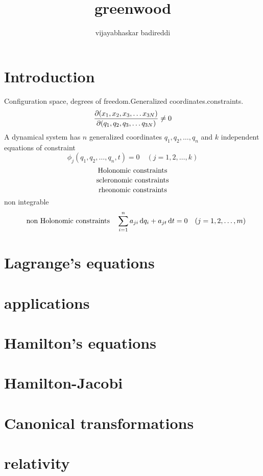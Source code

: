 \documentclass[12pt]{article}
\title{greenwood}
\author{vijayabhaskar badireddi}
\begin{document}

\section*{Introduction}
Configuration space,
degrees of freedom.Generalized coordinates.constraints.
\[\pdv{(x_1,x_2,x_3,\ldots x_{3N})}{(q_1,q_2,q_3,\ldots q_{3N})}\neq 0\]
A dynamical system has $n$ generalized coordinates $q_1,q_2,\ldots,q_n$ and $k$ independent equations of constraint \[\phi_j(q_1,q_2,\ldots,q_n,t)=0\quad(j=1,2,\ldots,k)\]
\[\qq{Holonomic constraints}\]
\[\qq{scleronomic constraints}\]
\[\qq{rheonomic constraints}\]
non integrable 
\[\qq{non Holonomic constraints}\sum_{i=1}^{n}a_{ji}\dd{q_i}+a_{jt}\dd{t}=0\quad(j=1,2,\ldots,m)\]
\section*{Lagrange's equations}
\section*{applications}
\section*{Hamilton's equations}
\section*{Hamilton-Jacobi}
\section*{Canonical transformations}
\section*{relativity}
\end{document}
